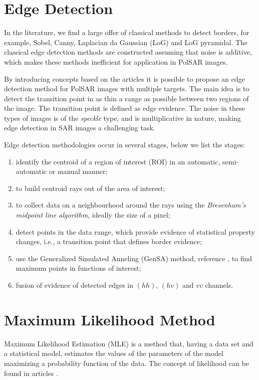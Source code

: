 \documentclass[conference]{IEEEtran}
\begin{document}
{{{{\section{Edge Detection}\label{sec_04}

In the literature, we find a large offer of classical methods to detect borders, for example, Sobel, Canny, Laplacian da Gaussian (LoG) and LoG pyramidal. The classical edge detection methods are constructed assuming that noise is additive, which makes these methods inefficient for application in PolSAR images.

By introducing concepts based on the articles \cite{nhfc, gmbf} it is possible to propose an edge detection method for PolSAR images with multiple targets. The main idea is to detect the transition point in as thin a range as possible between two regions of the image. The transition point is defined as edge evidence. The noise in these types of images is of the \textit{speckle} type, and is multiplicative in nature, making edge detection in SAR images a challenging task.

Edge detection methodologies occur in several stages, below we list the stages:

\begin{enumerate}
	\item identify the centroid of a region of interest (ROI) in an automatic, semi-automatic or manual manner;
	
	\item to build centroid rays out of the area of interest;
	\item to collect data on a neighbourhood around the rays using the {\it Bresenham's midpoint line algorithm}, ideally the size of a pixel;

	\item detect points in the data range, which provide evidence of statistical property changes, i.e., a transition point that defines border evidence;
	\item use the Generalized Simulated Anneling (GenSA) method, reference \cite{xgsh}, to find maximum points in functions of interest;
	\item fusion of evidence of detected edges in $(hh)$, $(hv)$ and $vv$ channels.
\end{enumerate}

\section{Maximum Likelihood Method}\label{sec_05}
Maximum Likelihood Estimation (MLE) is a method that, having a data set and a statistical model, estimates the values of the parameters of the model maximizing a probability function of the data. The concept of likelihood can be found in articles \cite{nhfc, gmbf}.

}}}}
\end{document}
